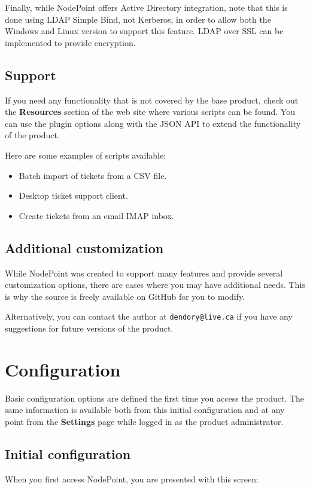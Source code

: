 \documentclass[11pt]{article}
\begin{document}
Finally, while NodePoint offers Active Directory integration, note that this is done using LDAP Simple Bind, not Kerberos, in order to allow both the Windows and Linux version to support this feature. LDAP over SSL can be implemented to provide encryption.

\subsection{Support}
If you need any functionality that is not covered by the base product, check out the \textbf{Resources} section of the web site where various scripts can be found. You can use the plugin options along with the JSON API to extend the functionality of the product.

Here are some examples of scripts available:

\begin{itemize}
\item Batch import of tickets from a CSV file.
\item Desktop ticket support client.
\item Create tickets from an email IMAP inbox.
\end{itemize}

\subsection{Additional customization}

While NodePoint was created to support many features and provide several customization options, there are cases where you may have additional needs. This is why the source is freely available on GitHub for you to modify.

Alternatively, you can contact the author at \texttt{dendory@live.ca} if you have any suggestions for future versions of the product.

\clearpage
\section{Configuration}
Basic configuration options are defined the first time you access the product. The same information is available both from this initial configuration and at any point from the \textbf{Settings} page while logged in as the product administrator.

\subsection{Initial configuration}
When you first access NodePoint, you are presented with this screen:
\end{document}
